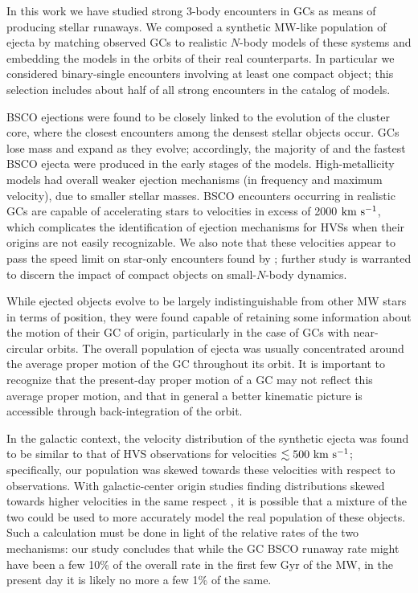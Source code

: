 \documentclass[twocolumn]{aastex631}
\newcommand{\kms}{${\rm km~s^{-1}}$}
\begin{document}
In this work we have studied strong 3-body encounters in GCs as means of producing stellar runaways.
We composed a synthetic MW-like population of ejecta by matching observed GCs to realistic $N$-body models of these systems and embedding the models in the orbits of their real counterparts.
In particular we considered binary-single encounters involving at least one compact object; this selection includes about half of all strong encounters in the catalog of models.

BSCO ejections were found to be closely linked to the evolution of the cluster core, where the closest encounters among the densest stellar objects occur.
GCs lose mass and expand as they evolve; accordingly, the majority of and the fastest BSCO ejecta were produced in the early stages of the models.
High-metallicity models had overall weaker ejection mechanisms (in frequency and maximum velocity), due to smaller stellar masses.
BSCO encounters occurring in realistic GCs are capable of accelerating stars to velocities in excess of 2000 \kms, which complicates the identification of ejection mechanisms for HVSs when their origins are not easily recognizable.
We also note that these velocities appear to pass the speed limit on star-only encounters found by \citet{1991AJ....101..562L}; further study is warranted to discern the impact of compact objects on small-$N$-body dynamics.

While ejected objects evolve to be largely indistinguishable from other MW stars in terms of position, they were found capable of retaining some information about the motion of their GC of origin, particularly in the case of GCs with near-circular orbits.
The overall population of ejecta was usually concentrated around the average proper motion of the GC throughout its orbit.
It is important to recognize that the present-day proper motion of a GC may not reflect this average proper motion, and that in general a better kinematic picture is accessible through back-integration of the orbit.

In the galactic context, the velocity distribution of the synthetic ejecta was found to be similar to that of HVS observations for velocities $\lesssim 500~{\rm km~s^{-1}}$; specifically, our population was skewed towards these velocities with respect to observations.
With galactic-center origin studies finding distributions skewed towards higher velocities in the same respect \citep{2018ApJ...866...39B}, it is possible that a mixture of the two could be used to more accurately model the real population of these objects.
Such a calculation must be done in light of the relative rates of the two mechanisms: our study concludes that while the GC BSCO runaway rate might have been a few 10\% of the overall rate in the first few Gyr of the MW, in the present day it is likely no more a few 1\% of the same.
\end{document}
